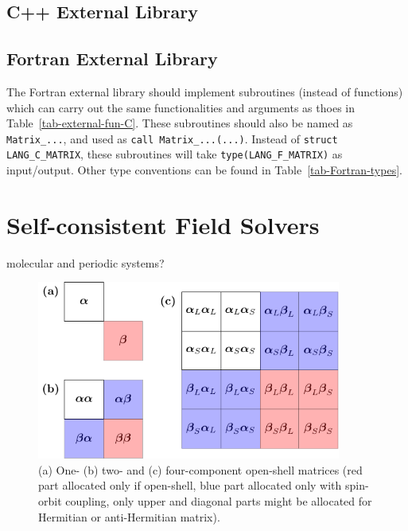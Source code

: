 \documentclass[a4paper,11pt,twoside,openright]{book}
\newcommand{\fixme}[1]{\textbf{\textit{\color{red} #1}}}
\begin{document}
\section{C++ External Library}
\label{section-cxx-external}

\section{Fortran External Library}
\label{section-fortran-external}

The Fortran external library should implement subroutines (instead of functions)
which can carry out the same functionalities and arguments as thoes in
Table~\ref{tab-external-fun-C}. These subroutines should also be named as
\verb|Matrix_...|, and used as \verb|call Matrix_...(...)|. Instead of
\verb|struct LANG_C_MATRIX|, these subroutines will take \verb|type(LANG_F_MATRIX)|
as input/output. Other type conventions can be found in Table~\ref{tab-Fortran-types}.

\chapter{Self-consistent Field Solvers}
\label{chapter-SCF-solvers}

molecular and periodic systems?

\begin{figure}[hbtp]
  \centering
  \includegraphics[width=10cm]{different_components.pdf}
  \caption{(a) One- (b) two- and (c) four-component open-shell matrices (red part
    allocated only if open-shell, blue part allocated only with spin-orbit coupling,
    only upper and diagonal parts might be allocated for Hermitian or anti-Hermitian
    matrix).}
  \label{fig-different-components}
\end{figure}

\end{document}
